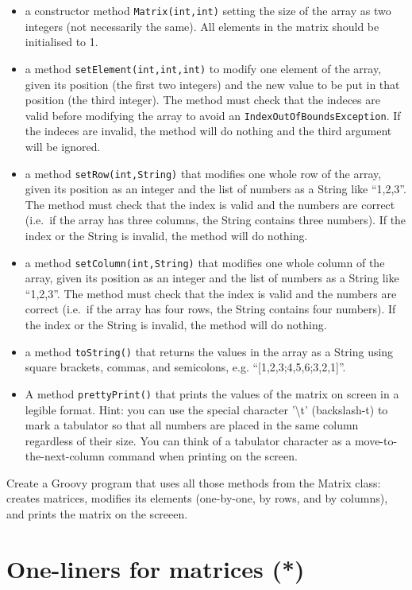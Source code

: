 \documentclass{article}
\begin{document}
\begin{itemize}
\item a constructor method \verb+Matrix(int,int)+ setting the size of
  the array as two 
  integers (not necessarily the same). All elements in the matrix
  should be initialised to 1. 
\item a method \verb+setElement(int,int,int)+ to modify one element
  of the array, given its position 
  (the first two integers) and the new value to be put in that 
  position (the third integer).
  The method must check that the indeces are valid
  before modifying the array to avoid an
  \verb+IndexOutOfBoundsException+. If the indeces are invalid, the
  method will do nothing and the third argument will be ignored.
\item a method \verb+setRow(int,String)+ that modifies one whole row
  of the array, given its position 
  as an integer and the list of numbers as a String like ``1,2,3''. 
  The method must check that the index is valid and the numbers are
  correct (i.e.~if the array has three columns, the String contains
  three numbers). If the index or the String is invalid, the
  method will do nothing. 
\item a method \verb+setColumn(int,String)+ that modifies one whole 
  column of the array, given its position 
  as an integer and the list of numbers as a String like ``1,2,3''. 
  The method must check that the index is valid and the numbers are
  correct (i.e.~if the array has four rows, the String contains
  four numbers). If the index or the String is invalid, the
  method will do nothing.
\item a method \verb+toString()+ that returns the values in the array
  as a String using square brackets, commas, and semicolons,
  e.g. ``[1,2,3;4,5,6;3,2,1]''. 
\item A method \verb+prettyPrint()+ that prints the values of the
  matrix on screen in a legible format. Hint: you can use the
  special character '\textbackslash t' (backslash-t) 
  to mark a tabulator so that all numbers are
  placed in the same column regardless of their size. You can think of
  a tabulator character as a move-to-the-next-column command when
  printing on the screen. 
\end{itemize}

Create a Groovy program that uses all those methods from the Matrix class:
creates matrices, modifies its elements (one-by-one, by rows, and by
columns), and prints the matrix on the screeen. 

\section{One-liners for matrices (*)}
\label{sec:creat-matr-one}
\end{document}
